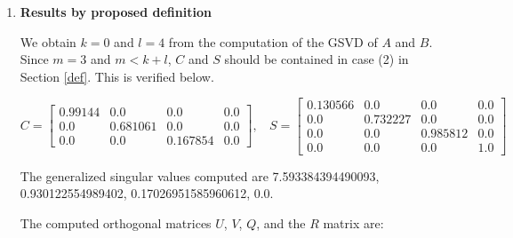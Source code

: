     \begin{enumerate}[(1).]
        \item \textbf{Results by proposed definition}
        
            We obtain $k = 0$ and $l = 4$ from the computation of the GSVD of $A$ and $B$. Since $m = 3$ and $m < k+l$, $C$ and $S$ should be contained in case (2) in Section \ref{def}. This is verified below. 
            
            \begin{equation*}
                C = \begin{bmatrix}
                 0.99144 & 0.0      & 0.0      & 0.0 \\
                 0.0     & 0.681061 & 0.0      & 0.0 \\
                 0.0     & 0.0      & 0.167854 & 0.0
                \end{bmatrix}, \ \ \ \
                S = \begin{bmatrix}
                 0.130566 & 0.0      & 0.0       & 0.0 \\
                 0.0      & 0.732227 & 0.0       & 0.0 \\
                 0.0      & 0.0      & 0.985812  & 0.0 \\
                 0.0      & 0.0      & 0.0       & 1.0
                \end{bmatrix}
            \end{equation*}
        
            The generalized singular values computed are 7.593384394490093, 0.930122554989402, 0.17026951585960612, 0.0.
        
            The computed orthogonal matrices $U$, $V$, $Q$, and the $R$ matrix are: 
        

\end{enumerate}
